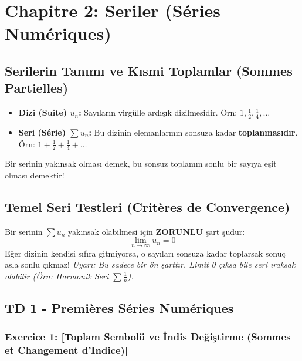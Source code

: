 \documentclass[12pt,a4paper]{report}
\begin{document}
\chapter{Chapitre 2: Seriler (Séries Numériques)}

\section{Serilerin Tanımı ve Kısmi Toplamlar (Sommes Partielles)}

\begin{tcolorbox}[colback=green!5!white,colframe=green!60!black,title=Hatırlatma: Dizi ve Seri Arasındaki Fark]
\begin{itemize}
    \item \textbf{Dizi (Suite) $u_n$:} Sayıların virgülle ardışık dizilmesidir. Örn: $1, \frac{1}{2}, \frac{1}{4}, \dots$
    \item \textbf{Seri (Série) $\sum u_n$:} Bu dizinin elemanlarının sonsuza kadar \textbf{toplanmasıdır}. Örn: $1 + \frac{1}{2} + \frac{1}{4} + \dots$
\end{itemize}
Bir serinin yakınsak olması demek, bu sonsuz toplamın sonlu bir sayıya eşit olması demektir!
\end{tcolorbox}

\section{Temel Seri Testleri (Critères de Convergence)}

\begin{tcolorbox}[colback=red!5!white,colframe=red!75!black,title=Çok Önemli: Genel Terim Testi (Condition Nécessaire)]
Bir serinin $\sum u_n$ yakınsak olabilmesi için \textbf{ZORUNLU} şart şudur:
\[ \lim_{n \to \infty} u_n = 0 \]
Eğer dizinin kendisi sıfıra gitmiyorsa, o sayıları sonsuza kadar toplarsak sonuç asla sonlu çıkmaz! 
\textit{Uyarı: Bu sadece bir ön şarttır. Limit 0 çıksa bile seri ıraksak olabilir (Örn: Harmonik Seri $\sum \frac{1}{n}$).}
\end{tcolorbox}

\section{TD 1 - Premières Séries Numériques}

\subsection*{Exercice 1: [Toplam Sembolü ve İndis Değiştirme (Sommes et Changement d'Indice)]}
\end{document}
